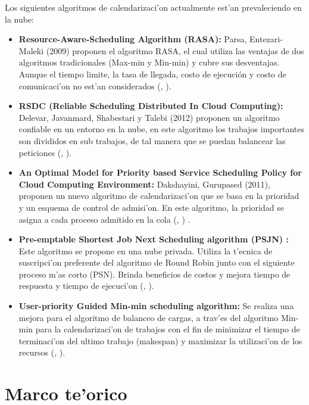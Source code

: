 Los siguientes algoritmos de calendarizaci'on actualmente est'an prevaleciendo en la nube:
\begin{itemize}
	\item \textbf{Resource-Aware-Scheduling Algorithm (RASA):} Parsa, Entezari-Maleki (2009) proponen el algoritmo RASA, el cual utiliza las ventajas de dos algoritmos tradicionales (Max-min y Min-min) y cubre sus desventajas. Aunque el tiempo limite, la tasa de llegada, costo de ejecución y costo de comunicaci'on no est'an considerados (\citeauthor{parsa2009rasa}, \citeyear{parsa2009rasa}).
	
	
	\item \textbf{RSDC (Reliable Scheduling Distributed In Cloud Computing):} Delevar, Javanmard, Shabestari y Talebi (2012) proponen un algoritmo confiable en un entorno en la nube, en este algoritmo los trabajos importantes son divididos en sub trabajos, de tal manera que se puedan balancear las peticiones (\citeauthor{delavar2012rsdc}, \citeyear{delavar2012rsdc}).
	
	
	\item \textbf{An Optimal Model for Priority based Service Scheduling Policy for Cloud Computing Environment:} Dakshayini, Gurupased (2011), proponen un nuevo algoritmo de calendarizaci'on que se basa en la prioridad y un esquema de control de admisi'on. En este algoritmo, la prioridad se asigna a cada proceso admitido en la cola (\citeauthor{dakshayini2011optimal}, \citeyear{dakshayini2011optimal}) . 
	
	
	\item \textbf{Pre-emptable Shortest Job Next Scheduling algorithm (PSJN) :}  Este algoritmo se propone en una nube privada. Utiliza la t'ecnica de suscripci'on preferente del algoritmo de Round Robin junto con el siguiente proceso m'as corto (PSN). Brinda beneficios de costos y mejora tiempo de respuesta y tiempo de ejecuci'on (\citeauthor{nishant}, \citeyear{nishant}). 
	
	
	\item \textbf{User-priority Guided Min-min scheduling algorithm:} Se realiza una mejora para el algoritmo de balanceo de cargas, a trav'es del algoritmo Min-min para la calendarizaci'on de trabajos con el fin de minimizar el tiempo de terminaci'on del ultimo trabajo (makespan) y maximizar la utilizaci'on de los recursos (\citeauthor{chen2013user}, \citeyear{chen2013user}). 
\end{itemize}



\section{Marco te'orico}

